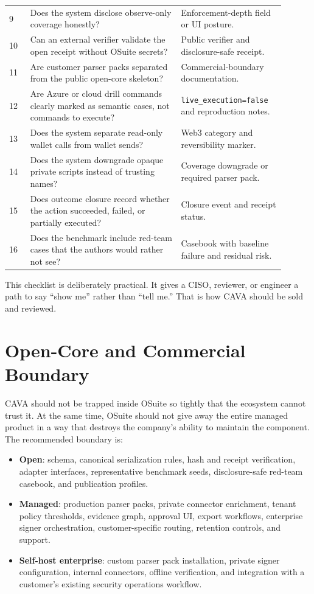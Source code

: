 \documentclass[11pt]{article}
\begin{document}
\begin{longtable}{@{}L{0.07\linewidth}L{0.50\linewidth}L{0.33\linewidth}@{}}
9 & Does the system disclose observe-only coverage honestly? & Enforcement-depth field or UI posture. \\
10 & Can an external verifier validate the open receipt without OSuite secrets? & Public verifier and disclosure-safe receipt. \\
11 & Are customer parser packs separated from the public open-core skeleton? & Commercial-boundary documentation. \\
12 & Are Azure or cloud drill commands clearly marked as semantic cases, not commands to execute? & \texttt{live\_execution=false} and reproduction notes. \\
13 & Does the system separate read-only wallet calls from wallet sends? & Web3 category and reversibility marker. \\
14 & Does the system downgrade opaque private scripts instead of trusting names? & Coverage downgrade or required parser pack. \\
15 & Does outcome closure record whether the action succeeded, failed, or partially executed? & Closure event and receipt status. \\
16 & Does the benchmark include red-team cases that the authors would rather not see? & Casebook with baseline failure and residual risk. \\
\bottomrule
\end{longtable}

This checklist is deliberately practical. It gives a CISO, reviewer, or engineer a path to say ``show me'' rather than ``tell me.'' That is how CAVA should be sold and reviewed.

\section{Open-Core and Commercial Boundary}

CAVA should not be trapped inside OSuite so tightly that the ecosystem cannot trust it. At the same time, OSuite should not give away the entire managed product in a way that destroys the company's ability to maintain the component. The recommended boundary is:

\begin{itemize}
  \item \textbf{Open}: schema, canonical serialization rules, hash and receipt verification, adapter interfaces, representative benchmark seeds, disclosure-safe red-team casebook, and publication profiles.
  \item \textbf{Managed}: production parser packs, private connector enrichment, tenant policy thresholds, evidence graph, approval UI, export workflows, enterprise signer orchestration, customer-specific routing, retention controls, and support.
  \item \textbf{Self-host enterprise}: custom parser pack installation, private signer configuration, internal connectors, offline verification, and integration with a customer's existing security operations workflow.
\end{itemize}
\end{document}
